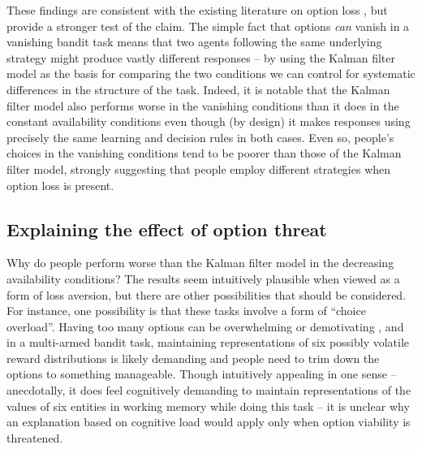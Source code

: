 \documentclass[a4paper,doc,natbib]{apa6}
\begin{document}
These findings are consistent with the existing literature on option loss \citep{shin2004keeping, bonney2016investigations, ejova2009walk, neth2014foraging}, but provide a stronger test of the claim. The simple fact that options {\it can} vanish in a vanishing bandit task means that two agents following the same underlying strategy might produce vastly different responses -- by using the Kalman filter model as the basis for comparing the two conditions we can control for systematic differences in the structure of the task. Indeed, it is notable that the Kalman filter model also performs worse in the vanishing conditions than it does in the constant availability conditions even though (by design) it makes responses using precisely the same learning and decision rules in both cases. Even so, people's choices in the vanishing conditions tend to be poorer than those of the Kalman filter model, strongly suggesting that people employ different strategies when option loss is present.

\subsection{Explaining the effect of option threat}

Why do people perform worse than the Kalman filter model in the decreasing availability conditions? The results seem intuitively plausible when viewed as a form of loss aversion, but there are other possibilities that should be considered. For instance, one possibility is that these tasks involve a form of ``choice overload''. Having too many options can be overwhelming or demotivating \citep{iyengar2000choice}, and in a multi-armed bandit task, maintaining representations of six possibly volatile reward distributions is likely demanding and people need to trim down the options to something manageable. Though intuitively appealing in one sense -- anecdotally, it does feel cognitively demanding to maintain representations of the values of six entities in working memory while doing this task -- it is unclear why an explanation based on cognitive load would apply only when option viability is threatened.
\end{document}
